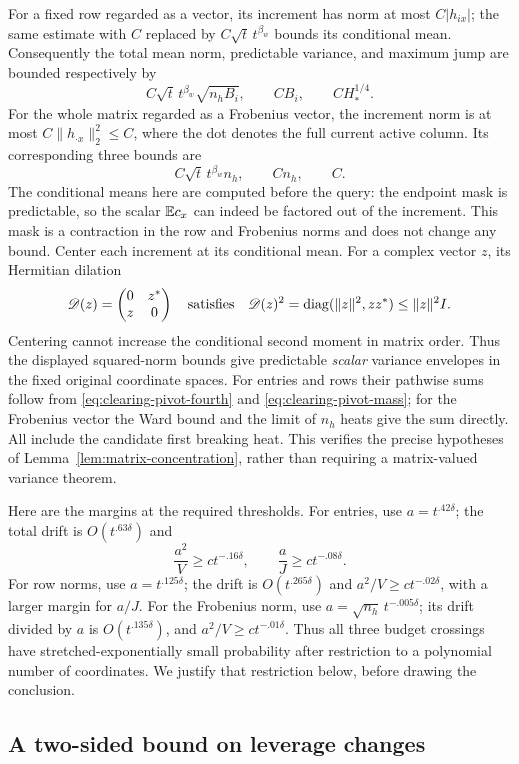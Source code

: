 For a fixed row regarded as a vector, its increment has norm at most
$C|h_{ix}|$; the same estimate with $C$ replaced by
$C\sqrt t\,t^{\beta_w}$ bounds its conditional mean.  Consequently the total
mean norm, predictable variance, and maximum jump are bounded respectively by
\[
 C\sqrt t\,t^{\beta_w}\sqrt{n_hB_i},\qquad
 CB_i,\qquad CH_*^{1/4}.
\]
For the whole matrix regarded as a Frobenius vector, the increment norm is at
most $C\|h_{\cdot x}\|_2^2\le C$, where the dot denotes the full current
active column. Its corresponding three bounds are
\[
 C\sqrt t\,t^{\beta_w}n_h,\qquad Cn_h,\qquad C.
\]
The conditional means here are computed before the query: the endpoint mask
is predictable, so the scalar $\mathbb E c_x$ can indeed be factored out of the
increment.  This mask is a contraction in the row and Frobenius norms and
does not change any bound.  Center each increment at its conditional mean.
For a complex vector $z$, its Hermitian dilation
\[
 \mathscr D(z)=\begin{pmatrix}0&z^*\\z&0\end{pmatrix}
 \quad\hbox{satisfies}\quad
 \mathscr D(z)^2=\operatorname{diag}(\|z\|^2,zz^*)\le\|z\|^2I.
\]
Centering cannot increase the conditional second moment in matrix order.
Thus the displayed squared-norm bounds give predictable \emph{scalar}
variance envelopes in the fixed original coordinate spaces. For entries and
rows their pathwise sums follow from \eqref{eq:clearing-pivot-fourth} and
\eqref{eq:clearing-pivot-mass}; for the Frobenius vector the Ward bound and
the limit of $n_h$ heats give the sum directly. All include the candidate
first breaking heat.
This verifies the precise hypotheses of
Lemma~\ref{lem:matrix-concentration}, rather than requiring a matrix-valued
variance theorem.

Here are the margins at the required thresholds.  For entries, use
$a=t^{.42\delta}$; the total drift is $O(t^{.63\delta})$ and
\[
 \frac{a^2}{V}\ge ct^{-.16\delta},\qquad
 \frac aJ\ge ct^{-.08\delta}.
\]
For row norms, use $a=t^{.125\delta}$; the drift is
$O(t^{.265\delta})$ and $a^2/V\ge ct^{-.02\delta}$, with a larger
margin for $a/J$.  For the Frobenius norm, use
$a=\sqrt{n_h}\,t^{-.005\delta}$; its drift divided by $a$ is
$O(t^{.135\delta})$, and $a^2/V\ge ct^{-.01\delta}$.
Thus all three budget crossings have stretched-exponentially small
probability after restriction to a polynomial number of coordinates.  We
justify that restriction below, before drawing the conclusion.

\subsection{A two-sided bound on leverage changes}

